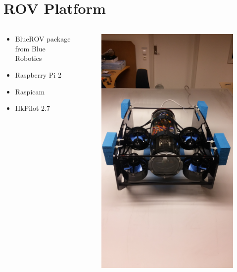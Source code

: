 \documentclass[11pt,aspectratio=169]{beamer}
\begin{document}
\section{ROV Platform}
\begin{frame}
\begin{columns}
\begin{column}{0.5\textwidth}
\begin{itemize}
\item BlueROV package from Blue Robotics
\item Raspberry Pi 2
\item Raspicam
\item HkPilot 2.7
\end{itemize}
\end{column}
\begin{column}{0.5\textwidth}
\begin{figure}
\includegraphics[trim={40cm 0cm 45cm 0cm},clip,angle=270,width=\textwidth]{fig/bluerov}
\end{figure}
\end{column}
\end{columns}


\end{frame}
\end{document}
